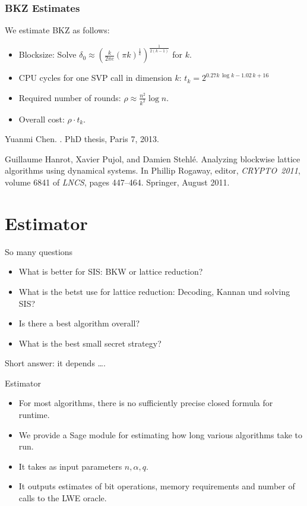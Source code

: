 \documentclass[10pt,compress]{beamer}
\begin{document}
\begin{frame}
  \frametitle{BKZ Estimates}
  We estimate BKZ as follows:
  \begin{itemize}
  \item Blocksize: Solve $\delta_0 \approx {\left( \frac{k}{2 \pi e} {(\pi k)}^{\frac{1}{k}}  \right)}^{\frac{1}{2(k-1)}}$ for $k$.
  \item CPU cycles for one SVP call in dimension $k$: $t_k = 2^{0.27k\,\log k - 1.02\,k + 16}$ 
  \item Required number of rounds: $\rho \approx \frac{n^2}{k^2} \log n$.
  \item Overall cost: $\rho \cdot t_k$.
  \end{itemize}

  \begin{thebibliography}{99}
    Yuanmi Chen.
    .
    \newblock PhD thesis, Paris 7, 2013.

    Guillaume Hanrot, Xavier Pujol, and Damien Stehl{\'e}.
    \newblock Analyzing blockwise lattice algorithms using dynamical systems.
    \newblock In Phillip Rogaway, editor, {\em CRYPTO~2011}, volume 6841 of {\em
      {LNCS}}, pages 447--464. Springer, August 2011.
  \end{thebibliography}
\end{frame}


\section{Estimator}

\begin{frame}{So many questions}
  \begin{itemize}
  \item What is better for SIS: BKW or lattice reduction?
  \item What is the betst use for lattice reduction: Decoding, Kannan und solving SIS?
  \item Is there a best algorithm overall?
  \item What is the best small secret strategy?
  \end{itemize} \pause
  Short answer: it depends \dots.
\end{frame}

\begin{frame}{Estimator}
  \begin{itemize}
  \item For most algorithms, there is no sufficiently precise closed formula for runtime.
  \item We provide a Sage module for estimating how long various algorithms take to run.
  \item It takes as input parameters $n, \alpha, q$.
  \item It outputs estimates of bit operations, memory requirements and number of calls to the LWE oracle.
  \end{itemize}
\end{frame}
\end{document}
